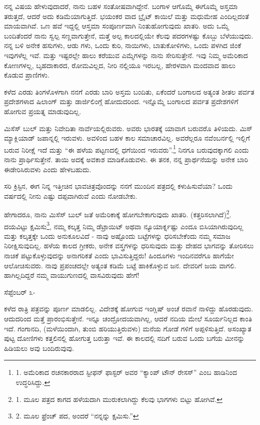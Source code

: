 ನನ್ನ ವಿಷಯ ಹೇಳುವುದಾದರೆ, ನಾನು ಬಹಳ ಸಂತೋಷವಾಗಿದ್ದೇನೆ. ಬಂಗಾಳ ಆಗೊಮ್ಮೆ ಈಗೊಮ್ಮೆ ಅಸ್ತಮಾ ತರುತ್ತದೆ, ಆದರೆ ಅದು ಕಡಿಮೆಯಾಗುತ್ತಿದೆ. ಭಯಂಕರ ವಾದ ಬ್ರೈಟ್ ಕಾಯಿಲೆ ಮತ್ತು ಮಧುಮೇಹ ಎಂದಿಲ್ಲದಂತೆ ಮಾಯವಾಗಿವೆ. ಒಣ ಹವೆ ಇದ್ದಲ್ಲಿ ಆಸ್ತಮಾ ಸಂಪೂರ್ಣವಾಗಿ ನಿಂತುಹೋಗುವುದು ಖಾತರಿ. ಅದು ಒಮ್ಮೆ ಬಂದಿತೆಂದರೆ ನಾನು ಸ್ವಲ್ಪ ಸಣ್ಣವಾಗುತ್ತೇನೆ, ಮತ್ತೆ ಅಲ್ಪ ಕಾಲದಲ್ಲಿಯೇ ಕೆಲವು ಪದರಗಳಷ್ಟು ಕೊಬ್ಬು ಬೆಳೆಯುವುದು. ನನ್ನ ಬಳಿ ಅನೇಕ ಹಸುಗಳು, ಆಡು ಗಳು, ಒಂದು ಕುರಿ, ನಾಯಿಗಳು, ಬಾತುಕೋಳಿಗಳು, ಒಂದು ಪಳಗಿದ ಜಿಂಕೆ ಇವುಗಳೆಲ್ಲ ಇವೆ. ಮತ್ತು ಇಷ್ಟರಲ್ಲೇ ಹಾಲು ಕರೆಯುವ ಎಮ್ಮೆಗಳನ್ನು ನಾನು ಸೇರಿಸುತ್ತೇನೆ. ಇವು ನಿಮ್ಮ ಅಮೆರಿಕಾದ ಕೋಣಗಳಲ್ಲ, ಬೃಹದಾಕಾರದ, ರೋಮವಿಲ್ಲದ, ನೀರಿ ನಲ್ಲಿಯೂ ಇರಬಲ್ಲ, ಹೇರಳವಾಗಿ ಮಂದವಾದ ಹಾಲು ಕೊಡುವ ಪ್ರಾಣಿಗಳು.

ಕಳೆದ ಎರಡು ತಿಂಗಳೊಳಗಾಗಿ ನನಗೆ ಎರಡು ಬಾರಿ ಅಸ್ತಮ ಬಂದಿತು, ಏಕೆಂದರೆ ಬಂಗಾಲದ ಅತ್ಯಂತ ಶೀತಲ ಪರ್ವತ ಪ್ರದೇಶಗಳಾದ ಷಿಲಾಂಗ್ ಮತ್ತು ಡಾರ್ಜಿಲಿಂಗ್ಗೆ ಹೋದುದರಿಂದ. ಇನ್ನೊಮ್ಮೆ ಬಂಗಾಲದ ಪರ್ವತ ಪ್ರದೇಶಗಳಿಗೆ ಹೋಗುವ ಪ್ರಯತ್ನ ಮಾಡುವುದಿಲ್ಲ.

ಮಿಸೆಸ್ ಬುಲ್ ಮತ್ತು ನಿವೇದಿತಾ ನಾರ್ವೆಯಲ್ಲಿರುವರು. ಅವರು ಭಾರತಕ್ಕೆ ಯಾವಾಗ ಬರುವರೊ ತಿಳಿಯದು. ಮಿಸ್ ಮ್ಯಾಕ್ಲಿಯಾಡ್ ಜಪಾನ್ನಲ್ಲಿ ಇರುವಳು. ಅವಳಿಂದ ಬಹಳ ಕಾಲ ಸಮಾಚಾರವಿಲ್ಲ. ಅವರೆಲ್ಲರೂ ನವೆಂಬರ್ನಲ್ಲಿ ಇಲ್ಲಿಗೆ ಬರುವ ನಿರೀಕ್ಷೆ ಇದೆ ಮತ್ತು “ಈ ಹಳೆಯ ಪಟ್ಟಣದಲ್ಲಿ ಧಗೆಯಿಂದ ಇರುವರು”.\footnote{1. ಅಮೆರಿಕಾದ ರಚನಕಾರರಾದ ಸ್ಟೀಫನ್ ಫಾಸ್ಟರ್ ಅವರ “ಕ್ಯಾಂಪ್ ಟೌನ್ ರೇಸಸ್” ಎಂಬ ಹಾಡಿನಿಂದ ಉದ್ಧರಿಸಿದ್ದು.} ನಿನಗೂ ಬರುವುದಕ್ಕಾಗಲಿ ಎಂದು ನಾನು ಪ್ರಾರ್ಥಿಸುತ್ತೇನೆ. ತಾಯಿ ಅದಕ್ಕೆ ಅವಕಾಶ ಮಾಡಿಕೊಡುವಳು. ಈ ತನಕ, ನನ್ನ ಪ್ರಾರ್ಥನೆಯನ್ನು ಅನೇಕ ಬಾರಿ ಈಡೇರಿಸಿರುವಳು ಎಂದು ಹೇಳಬಹುದು.

ಸರಿ ಕ್ರಿಸ್ಟಿನ, ಈಗ ನಿನ್ನ ಇತ್ತೀಚಿನ ಭಾವಚಿತ್ರವೊಂದನ್ನು ನನಗೆ ಮುಂದಿನ ಪತ್ರದಲ್ಲಿ ಕಳುಹಿಸುವೆಯಾ? ಒಂದು ವರ್ಷದಲ್ಲಿ ನೀನು ಎಷ್ಟು ದಪ್ಪವಾಗಿರುವೆ ಎಂದು ನೋಡಬೇಕು.

ಹೇಗಾದರೂ, ನಾನು ಮಿಸೆಸ್ ಬುಲ್ ಜತೆ ಅಮೆರಿಕಾಕ್ಕೆ ಹೋಗಬೇಕಾಗುವುದು ಖಾತರಿ. (ಕತ್ತರಿಸಲಾಗಿದೆ)\footnote{1. ಮೂಲ ಪತ್ರದ ಕಾಗದ ಹಳೆಯದಾಗಿ ಮುರುಕಲಾಗಿದ್ದು ಕೆಲವು ಭಾಗಗಳು ಬಿಟ್ಟು ಹೋಗಿವೆ.}. ದಯವಿಟ್ಟು ಕ್ಷಮಿಸು\footnote{2. ಮೂಲ ಫ್ರೆಂಚ್ ಪದ, ಅಂದರೆ “ನನ್ನನ್ನು ಕ್ಷಮಿಸು.”}, ನಮ್ಮ ಕಲ್ಕತ್ತ ನಿಮ್ಮ ಡೆಟ್ರಾಯಿಟ್ ಅಥವಾ ನ್ಯೂಯಾರ್ಕ್ನಷ್ಟು ಎಂದೂ ಬಿಸಿಯಾಗಿರುವುದಿಲ್ಲ ಮತ್ತು ಕಲ್ಕತ್ತಕ್ಕೇ ಒಂದು ಅನುಕೂಲವಿದೆ - ನಾವು ಅಷ್ಟೊಂದು ಬಟ್ಟೆಗಳನ್ನು ಧರಿಸಬೇಕೆಂದು ನಮ್ಮ ಸಮಾಜ ನಿರೀಕ್ಷಿಸುವುದಿಲ್ಲ. ಹಳೆಯ ಕಾಲದ ಗ್ರೀಕರು, ಅನೇಕ ವಸ್ತ್ರಗಳನ್ನು ಧರಿಸುವುದು ಮತ್ತು ದೇಹದ ಭಾಗವನ್ನು ತೋರಿಸಲು ನಾಚಿಕೆ ಪಟ್ಟುಕೊಳ್ಳುವುದನ್ನು ಅನಾಗರಿಕತೆ ಎಂದು ಭಾವಿಸುತ್ತಿದ್ದರು! ಹಿಂದೂಗಳು ಇಂದಿನವರೆಗೂ ಹಾಗೆಯೇ ಆಲೋಚಿಸುವರು. ನಾವು ಪ್ರಪಂಚದಲ್ಲೇ ಅತ್ಯಂತ ಕಡಿಮೆ ಬಟ್ಟೆ ಹಾಕಿಕೊಳ್ಳುವ ಜನ. ದೇವರಿಗೆ ಜಯ ವಾಗಲಿ. ಹಾಗಿಲ್ಲದಿದ್ದರೆ ನಮ್ಮ ವಾಯುಗುಣದಲ್ಲಿ ವಾಸವಿರುವುದು ಹೇಗೆ!

ಸೆಪ್ಟೆಂಬರ್ ೩-

ಕಳೆದ ರಾತ್ರಿ ಪತ್ರವನ್ನು ಪೂರ್ಣ ಮಾಡಲಿಲ್ಲ. ವಿದೇಶಕ್ಕೆ ಹೋಗುವ ಇಂಗ್ಲಿಷ್ ಅಂಚೆ ರವಾನೆ ನಾಳಿದ್ದು ಹೊರಡುವುದು. ಆದುದರಿಂದ ಮತ್ತೆ ಪ್ರಾರಂಭಿಸುತ್ತೇನೆ. ಇನ್ನೂ ಚಂದ್ರೋದಯವಾಗಿಲ್ಲ, ಆದರೆ ನದಿಯ ಮೇಲೆ ಸೂರ್ಯನಿಲ್ಲದ ಕಾಂತಿ ಇದೆ. ಗಂಗಾನದಿ, (ಮಳೆಯಿಂದಾಗಿ, ತುಂಬಿ ಹರಿಯುತ್ತಿರುವಳು) ಮನೆಯ ಗೋಡೆ ಗಳಿಗೆ ಅಪ್ಪಳಿಸುತ್ತಿದೆ. ಅಸಂಖ್ಯಾತ ಪುಟ್ಟ ದೋಣಿಗಳು ಕತ್ತಲಿನಲ್ಲಿ ಹೋಗುತ್ತ ಬರುತ್ತಾ ಇವೆ. ಈ ಕಾಲದಲ್ಲಿ ನದಿಗೆ ಬರುವ ಒಂದು ಬಗೆಯ ಮೀನನ್ನು ಹಿಡಿಯಲು ಅವು ಬಂದಿರುವುವು.

